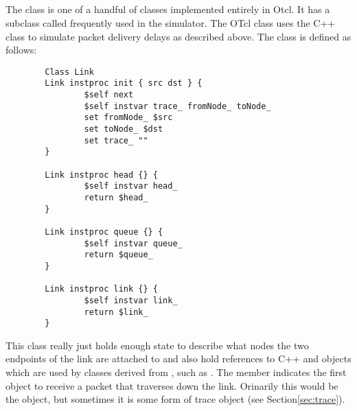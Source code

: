 \subsection{}

The  class is one of a handful of classes implemented
entirely in Otcl.  It has a subclass called 
frequently used in the simulator.
The OTcl  class uses the C++  class
to simulate packet delivery delays as described above.
The  class is defined as follows:
\begin{small}
\begin{verbatim}
        Class Link
        Link instproc init { src dst } {
                $self next
                $self instvar trace_ fromNode_ toNode_
                set fromNode_ $src
                set toNode_ $dst
                set trace_ ""
        }

        Link instproc head {} {
                $self instvar head_
                return $head_
        }

        Link instproc queue {} {
                $self instvar queue_
                return $queue_
        }

        Link instproc link {} {
                $self instvar link_
                return $link_
        }
\end{verbatim}
\end{small}
This class really just holds enough state to describe what nodes the two
endpoints of the link are attached to and also hold references to
C++  and  objects which are used by classes
derived from , such as .
The  member indicates the first object to receive
a packet that traverses down the link.
Orinarily this would be the  object, but
sometimes it is some form of trace object (see Section\ref{sec:trace}).


\subsection{}

